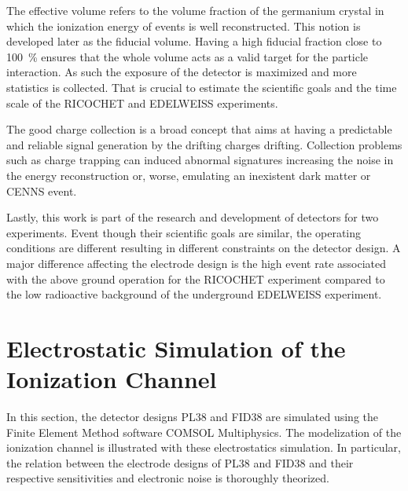 The effective volume refers to the volume fraction of the germanium crystal in which the ionization energy of events is well reconstructed. This notion is developed later as the fiducial volume. Having a high fiducial fraction close to \SI{100}{\percent} ensures that the whole volume acts as a valid target for the particle interaction. As such the exposure of the detector is maximized and more statistics is collected. That is crucial to estimate the scientific goals and the time scale of the RICOCHET and EDELWEISS experiments. 

The good charge collection is a broad concept that aims at having a predictable and reliable signal generation by the drifting charges drifting. Collection problems such as charge trapping can induced abnormal signatures increasing the noise in the energy reconstruction or, worse, emulating an inexistent dark matter or CENNS event. 

Lastly, this work is part of the research and development of detectors for two experiments. Event though their scientific goals are similar, the operating conditions are different resulting in different constraints on the detector design. A major difference affecting the electrode design is the high event rate associated with the above ground operation for the RICOCHET experiment compared to the low radioactive background of the underground EDELWEISS experiment. 



\section{Electrostatic Simulation of the Ionization Channel}
\label{sec:simulation-ionization}

In this section, the detector designs PL38 and FID38 are simulated using the Finite Element Method software COMSOL Multiphysics. The modelization of the ionization channel is illustrated with these electrostatics simulation. In particular, the relation between the electrode designs of PL38 and FID38 and their respective sensitivities and electronic noise is thoroughly theorized.

